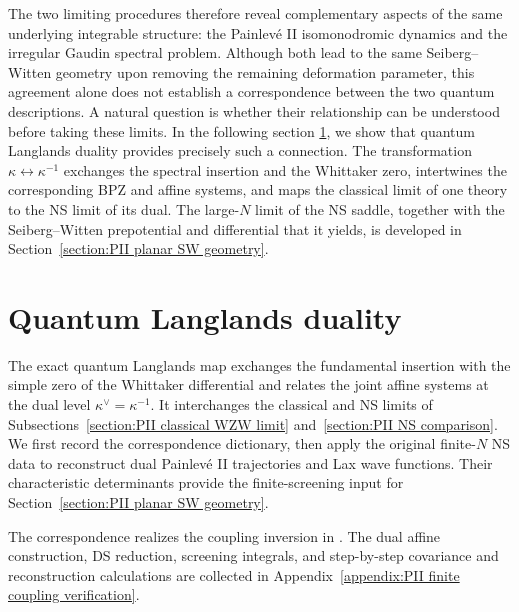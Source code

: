 \documentclass[a4paper,11pt]{article}
\numberwithin{equation}{section}
\begin{document}
The two limiting procedures therefore reveal complementary aspects of the same underlying integrable structure: the Painlev\'e II isomonodromic dynamics and the irregular Gaudin spectral problem. Although both lead to the same Seiberg–Witten geometry upon removing the remaining deformation parameter, this agreement alone does not establish a correspondence between the two quantum descriptions. A natural question is whether their relationship can be understood before taking these limits. In the following section \ref{section:PII Langlands interpretation}, we show that quantum Langlands duality provides precisely such a connection. The transformation $\kappa\leftrightarrow\kappa^{-1}$ exchanges the spectral insertion and the Whittaker zero, intertwines the corresponding BPZ and affine systems, and maps the classical limit of one theory to the NS limit of its dual. The large-$N$ limit of the NS saddle, together with the Seiberg--Witten prepotential and differential that it yields, is developed in Section~\ref{section:PII planar SW geometry}.

\section{Quantum Langlands duality}
\label{section:PII Langlands interpretation}

The exact quantum Langlands map exchanges the fundamental insertion
with the simple zero of the Whittaker differential and relates the
joint affine systems at the dual level $\kappa^{\vee}=\kappa^{-1}$.
It interchanges the classical and NS limits of
Subsections~\ref{section:PII classical WZW limit}
and~\ref{section:PII NS comparison}.  We first record the
correspondence dictionary, then apply the original finite-$N$ NS
data to reconstruct dual Painlev\'e II trajectories and Lax wave
functions.  Their characteristic determinants provide the
finite-screening input for
Section~\ref{section:PII planar SW geometry}.

The correspondence realizes the coupling inversion in
\cite{FrenkelGukovTeschner2015,ArakawaFrenkel2019,GiribetNakayamaNicolas2008}.
The dual affine construction, DS reduction, screening integrals,
and step-by-step covariance and reconstruction calculations are
collected in Appendix~\ref{appendix:PII finite coupling verification}.
\end{document}
